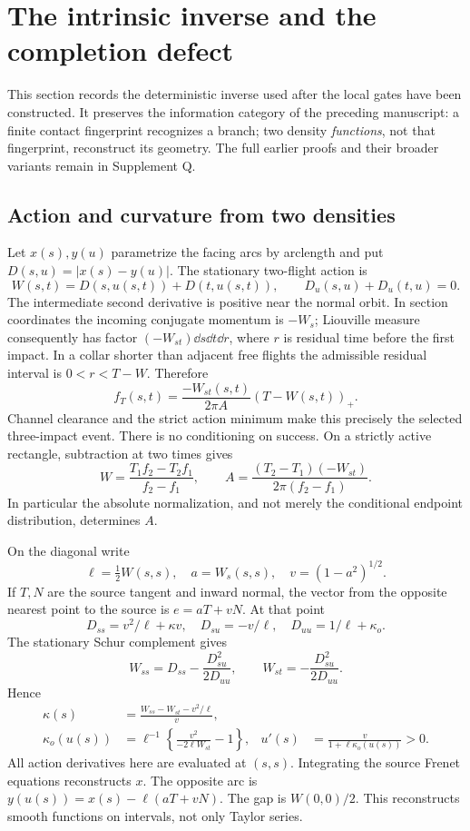 \section{The intrinsic inverse and the completion defect}
\label{sec:inverse}
This section records the deterministic inverse used after the local gates
have been constructed. It preserves the information category of the
preceding manuscript: a finite contact fingerprint recognizes a branch;
two density \emph{functions}, not that fingerprint, reconstruct its geometry.
The full earlier proofs and their broader variants remain in Supplement Q.

\subsection{Action and curvature from two densities}
Let $x(s),y(u)$ parametrize the facing arcs by arclength and put
$D(s,u)=|x(s)-y(u)|$. The stationary two-flight action is
\[
 W(s,t)=D(s,u(s,t))+D(t,u(s,t)),\qquad
                       D_u(s,u)+D_u(t,u)=0.
\]
The intermediate second derivative is positive near the normal orbit.
In section coordinates the incoming conjugate momentum is $-W_s$;
Liouville measure consequently has factor $(-W_{st})\dd s\dd t\dd r$,
where $r$ is residual time before the first impact. In a collar shorter
than adjacent free flights the admissible residual interval is
$0<r<T-W$. Therefore
\begin{equation}\label{eq:law}
 f_T(s,t)=\frac{-W_{st}(s,t)}{2\pi A}(T-W(s,t))_+.
\end{equation}
Channel clearance and the strict action minimum make this precisely the
selected three-impact event. There is no conditioning on success.
On a strictly active rectangle, subtraction at two times gives
\begin{equation}\label{eq:ratio}
 W=\frac{T_1f_2-T_2f_1}{f_2-f_1},\qquad
 A=\frac{(T_2-T_1)(-W_{st})}{2\pi(f_2-f_1)}.
\end{equation}
In particular the absolute normalization, and not merely the conditional
endpoint distribution, determines $A$.

On the diagonal write
\[
 \ell=\tfrac12W(s,s),\quad a=W_s(s,s),\quad v=(1-a^2)^{1/2}.
\]
If $T,N$ are the source tangent and inward normal, the vector from the
opposite nearest point to the source is $e=aT+vN$. At that point
\[
 D_{ss}=v^2/\ell+\kappa v,\quad D_{su}=-v/\ell,
 \quad D_{uu}=1/\ell+\kappa_o.
\]
The stationary Schur complement gives
\[
 W_{ss}=D_{ss}-\frac{D_{su}^2}{2D_{uu}},\qquad
 W_{st}=-\frac{D_{su}^2}{2D_{uu}}.
\]
Hence
\begin{align}
 \kappa(s)&=\frac{W_{ss}-W_{st}-v^2/\ell}{v},\label{eq:curv-source}\\
 \kappa_o(u(s))&=\ell^{-1}
                   \left\{\frac{v^2}{-2\ell W_{st}}-1\right\},
 &u'(s)&=\frac{v}{1+\ell\kappa_o(u(s))}>0.\label{eq:curv-target}
\end{align}
All action derivatives here are evaluated at $(s,s)$. Integrating the
source Frenet equations reconstructs $x$. The opposite arc is
$y(u(s))=x(s)-\ell(aT+vN)$. The gap is $W(0,0)/2$.
This reconstructs smooth functions on intervals, not only Taylor series.


